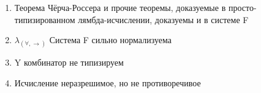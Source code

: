  	
    \begin{enumerate}
        \item Теорема Чёрча-Россера и прочие теоремы, доказуемые в просто-типизированном лямбда-исчислении, доказуемы и в системе F
 	    \item $\lambda_{(\forall, \rightarrow)}$ Система F сильно нормализуема
 	    \item Y комбинатор не типизируем
	    \item Исчисление неразрешимое, но не противоречивое
    \end{enumerate}

